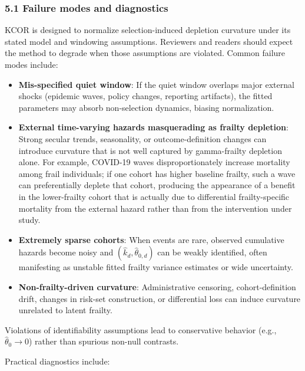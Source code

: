 \documentclass[
]{article}
\providecommand{\tightlist}{%
  \setlength{\itemsep}{0pt}\setlength{\parskip}{0pt}}
\begin{document}
\subsubsection{5.1 Failure modes and
diagnostics}\label{failure-modes-and-diagnostics}

KCOR is designed to normalize selection-induced depletion curvature
under its stated model and windowing assumptions. Reviewers and readers
should expect the method to degrade when those assumptions are violated.
Common failure modes include:

\begin{itemize}
\tightlist
\item
  \textbf{Mis-specified quiet window}: If the quiet window overlaps
  major external shocks (epidemic waves, policy changes, reporting
  artifacts), the fitted parameters may absorb non-selection dynamics,
  biasing normalization.
\item
  \textbf{External time-varying hazards masquerading as frailty
  depletion}: Strong secular trends, seasonality, or outcome-definition
  changes can introduce curvature that is not well captured by
  gamma-frailty depletion alone. For example, COVID-19 waves
  disproportionately increase mortality among frail individuals; if one
  cohort has higher baseline frailty, such a wave can preferentially
  deplete that cohort, producing the appearance of a benefit in the
  lower-frailty cohort that is actually due to differential
  frailty-specific mortality from the external hazard rather than from
  the intervention under study.
\item
  \textbf{Extremely sparse cohorts}: When events are rare, observed
  cumulative hazards become noisy and \((\hat{k}_d,\hat{\theta}_{0,d})\)
  can be weakly identified, often manifesting as unstable fitted frailty
  variance estimates or wide uncertainty.
\item
  \textbf{Non-frailty-driven curvature}: Administrative censoring,
  cohort-definition drift, changes in risk-set construction, or
  differential loss can induce curvature unrelated to latent frailty.
\end{itemize}

Violations of identifiability assumptions lead to conservative behavior
(e.g., \(\hat{\theta}_0 \to 0\)) rather than spurious non-null
contrasts.

Practical diagnostics include:
\end{document}
